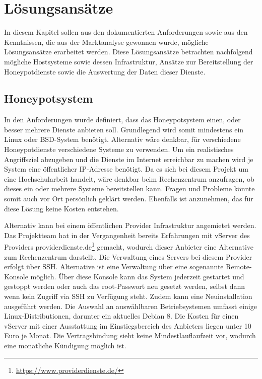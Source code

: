 \chapter{Lösungsansätze}
\label{ch:Lösungsansätze}

In diesem Kapitel sollen aus den dokumentierten Anforderungen sowie aus den Kenntnissen, die aus der Marktanalyse gewonnen wurde, mögliche Lösungsansätze erarbeitet werden. Diese Lösungsansätze betrachten nachfolgend mögliche Hostsysteme sowie dessen Infrastruktur, Ansätze zur Bereitstellung der Honeypotdienste sowie die Auswertung der Daten dieser Dienste.\\

\section{Honeypotsystem}
\label{sec:Honeypotsystem}

In den Anforderungen wurde definiert, dass das Honeypotsystem einen, oder besser mehrere Dienste anbieten soll. Grundlegend wird somit mindestens ein Linux oder BSD-System benötigt. Alternativ wäre denkbar, für verschiedene Honeypotdienste verschiedene Systeme zu verwenden. Um ein realistisches Angriffsziel abzugeben und die Dienste im Internet erreichbar zu machen wird je System eine öffentlicher IP-Adresse benötigt. Da es sich bei diesem Projekt um eine Hochschularbeit handelt, wäre denkbar beim Rechenzentrum anzufragen, ob dieses ein oder mehrere Systeme bereitstellen kann. Fragen und Probleme könnte somit auch vor Ort persönlich geklärt werden. Ebenfalls ist anzunehmen, das für diese Lösung keine Kosten entstehen.


Alternativ kann bei einem öffentlichen Provider Infrastruktur angemietet werden. Das Projektteam hat in der Vergangenheit bereits Erfahrungen mit vServer des Providers providerdienste.de\footnote{\url{https://www.providerdienste.de/}} gemacht, wodurch dieser Anbieter eine Alternative zum Rechenzentrum darstellt. Die Verwaltung eines Servers bei diesem Provider erfolgt über SSH. Alternative ist eine Verwaltung über eine sogenannte Remote-Konsole möglich. Über diese Konsole  kann das System jederzeit gestartet und gestoppt werden oder auch das root-Passwort neu gesetzt werden, selbst dann wenn kein Zugriff via SSH zu Verfügung steht. Zudem kann eine Neuinstallation ausgeführt werden. Die Auswahl an auswählbaren Betriebsystemen umfasst einige Linux-Distributionen, darunter ein aktuelles Debian 8. Die Kosten für einen vServer mit einer Ausstattung im Einstiegsbereich des Anbieters liegen unter 10 Euro je Monat. Die Vertragsbindung sieht keine Mindestlauflaufzeit vor, wodurch eine monatliche Kündigung möglich ist.

